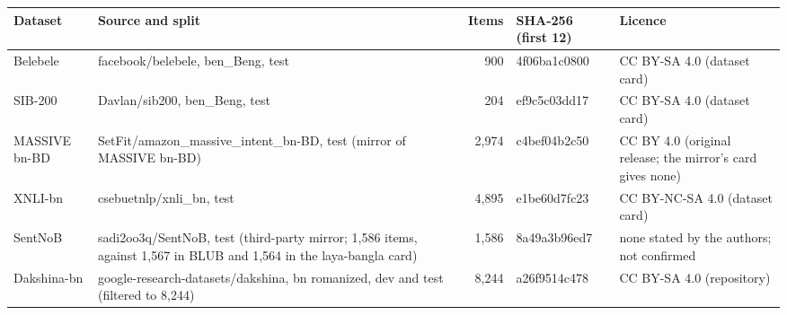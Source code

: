 \begin{tabular}{@{}lp{4.6cm}rlp{3.4cm}@{}}\toprule
Dataset & Source and split & Items & SHA-256 (first 12) & Licence \\\midrule
Belebele & facebook/belebele, ben\_Beng, test & 900 & 4f06ba1c0800 & CC BY-SA 4.0 (dataset card) \\
SIB-200 & Davlan/sib200, ben\_Beng, test & 204 & ef9c5c03dd17 & CC BY-SA 4.0 (dataset card) \\
MASSIVE bn-BD & SetFit/\allowbreak amazon\_massive\_intent\_bn-BD, test (mirror of MASSIVE bn-BD) & 2,974 & c4bef04b2c50 & CC BY 4.0 (original release; the mirror's card gives none) \\
XNLI-bn & csebuetnlp/xnli\_bn, test & 4,895 & e1be60d7fc23 & CC BY-NC-SA 4.0 (dataset card) \\
SentNoB & sadi2oo3q/SentNoB, test (third-party mirror; 1,586 items, against 1,567 in BLUB and 1,564 in the laya-bangla card) & 1,586 & 8a49a3b96ed7 & none stated by the authors; not confirmed \\
Dakshina-bn & google-research-datasets/\allowbreak dakshina, bn romanized, dev and test (filtered to 8,244) & 8,244 & a26f9514c478 & CC BY-SA 4.0 (repository) \\
\bottomrule\end{tabular}
